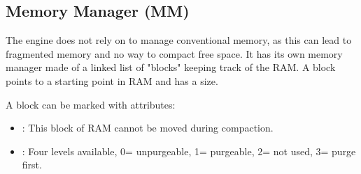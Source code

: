 \documentclass[book.tex]{subfiles}
\begin{document}
\subsection{Memory Manager (MM)}
The engine does not rely on  to manage conventional memory, as this can lead to fragmented memory and no way to compact free space. It has its own memory manager made of a linked list of "blocks" keeping track of the RAM. A block points to a starting point in RAM and has a size.\\
 \par

 \par
A block can be marked with attributes:
\begin{itemize}
\item {} : This block of RAM cannot be moved during compaction.
\item {} : Four levels available, 0= unpurgeable, 1= purgeable, 2= not used, 3= purge first.
\end{itemize}
\end{document}

